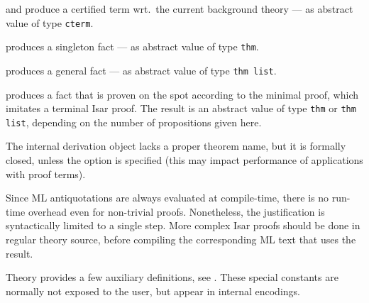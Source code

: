 \begin{isabellebody}
\begin{isamarkuptext}
\begin{description}
  \item {} and  produce a
  certified term wrt.\ the current background theory --- as abstract
  value of type \verb|cterm|.

  \item {} produces a singleton fact --- as abstract
  value of type \verb|thm|.

  \item {} produces a general fact --- as abstract
  value of type \verb|thm list|.

  \item {} produces a fact that is proven on
  the spot according to the minimal proof, which imitates a terminal
  Isar proof.  The result is an abstract value of type \verb|thm|
  or \verb|thm list|, depending on the number of propositions
  given here.

  The internal derivation object lacks a proper theorem name, but it
  is formally closed, unless the  option is specified
  (this may impact performance of applications with proof terms).

  Since ML antiquotations are always evaluated at compile-time, there
  is no run-time overhead even for non-trivial proofs.  Nonetheless,
  the justification is syntactically limited to a single \hyperlink{command.by}{\mbox{}} step.  More complex Isar proofs should be done in regular
  theory source, before compiling the corresponding ML text that uses
  the result.

  \end{description}%
\end{isamarkuptext}%
\isamarkuptrue%
%
\endisatagmlantiq
{\isafoldmlantiq}%
%
\isadelimmlantiq
%
\endisadelimmlantiq
%
\isamarkuptrue%
%
\begin{isamarkuptext}%
Theory  provides a few auxiliary definitions, see
  .  These special constants are normally not
  exposed to the user, but appear in internal encodings.


\end{isamarkuptext}
\end{isabellebody}
